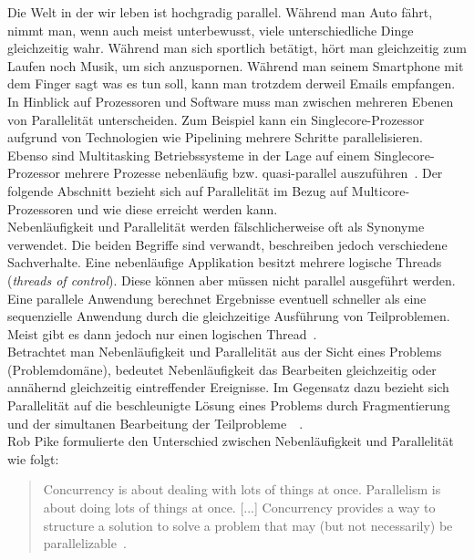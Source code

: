 Die Welt in der wir leben ist hochgradig parallel. Während man Auto fährt, nimmt man, wenn auch  meist unterbewusst, viele unterschiedliche Dinge gleichzeitig wahr. Während man sich sportlich betätigt, hört man gleichzeitig zum Laufen noch Musik, um sich anzuspornen. Während man seinem Smartphone mit dem Finger sagt was es tun soll, kann man trotzdem derweil Emails empfangen.\\
In Hinblick auf Prozessoren und Software muss man zwischen mehreren Ebenen von Parallelität unterscheiden. Zum Beispiel kann ein Singlecore-Prozessor aufgrund von Technologien wie Pipelining mehrere Schritte parallelisieren. Ebenso sind Multitasking Betriebssysteme in der Lage auf einem Singlecore-Prozessor mehrere Prozesse nebenläufig bzw. quasi-parallel auszuführen~\cite[S.~3~\&~S.~4]{butcher_seven_2014}. Der folgende Abschnitt bezieht sich auf Parallelität im Bezug auf Multicore-Prozessoren und wie diese erreicht werden kann.\\
Nebenläufigkeit und Parallelität werden fälschlicherweise oft als Synonyme verwendet. Die beiden Begriffe sind verwandt, beschreiben jedoch verschiedene Sachverhalte. Eine nebenläufige Applikation besitzt mehrere logische Threads (\textit{threads of control}). Diese können aber müssen nicht parallel ausgeführt werden. Eine parallele Anwendung berechnet Ergebnisse eventuell schneller als eine sequenzielle Anwendung durch die gleichzeitige Ausführung von Teilproblemen. Meist gibt es dann jedoch nur einen logischen Thread~\cite[S.~1]{butcher_seven_2014}.\\
Betrachtet man Nebenläufigkeit und Parallelität aus der Sicht eines Problems (Problemdomäne), bedeutet Nebenläufigkeit das Bearbeiten gleichzeitig oder annähernd gleichzeitig eintreffender Ereignisse. Im Gegensatz dazu bezieht sich Parallelität auf die beschleunigte Lösung eines Problems durch Fragmentierung und der simultanen Bearbeitung der Teilprobleme~\cite[S.~2]{butcher_seven_2014}~\cite[S.~15]{vernon_reactive_2016}.\\
Rob Pike formulierte den Unterschied zwischen Nebenläufigkeit und Parallelität wie folgt:

\begin{quotation}
  Concurrency is about dealing with lots of things at once. Parallelism is about doing lots of things at once. [...] Concurrency provides a way to structure a solution to solve a problem that may (but not necessarily) be parallelizable~.
\cite[S.~10]{pike_concurrency_2012}
\end{quotation}

